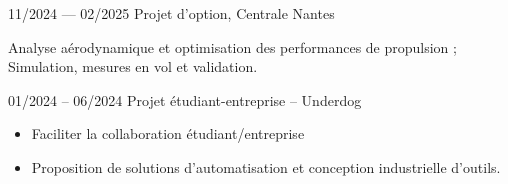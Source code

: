 

        {11/2024 — 02/2025}
        {Projet d'option, Centrale Nantes}
        {%
        Analyse aérodynamique et optimisation des performances de propulsion ; Simulation, mesures en vol et validation.

        }

        {01/2024 -- 06/2024}
        {Projet étudiant-entreprise -- Underdog}
        {%
          \begin{itemize}
            \item Faciliter la collaboration étudiant/entreprise
            \item Proposition de solutions d'automatisation et conception industrielle d'outils.
          \end{itemize}
        }